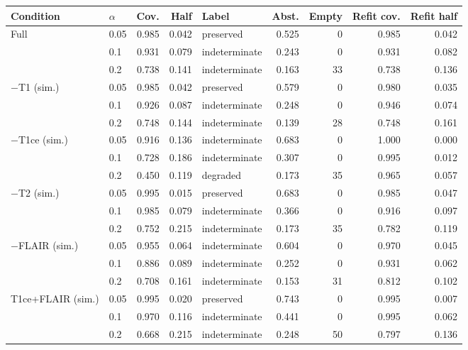 \begin{tabular}{llrrlrrrr}
\toprule
Condition & $\alpha$ & Cov. & Half & Label & Abst. & Empty & Refit cov. & Refit half \\
\midrule
Full & 0.05 & 0.985 & 0.042 & preserved & 0.525 & 0 & 0.985 & 0.042 \\
 & 0.1 & 0.931 & 0.079 & indeterminate & 0.243 & 0 & 0.931 & 0.082 \\
 & 0.2 & 0.738 & 0.141 & indeterminate & 0.163 & 33 & 0.738 & 0.136 \\
$-$T1 (sim.) & 0.05 & 0.985 & 0.042 & preserved & 0.579 & 0 & 0.980 & 0.035 \\
 & 0.1 & 0.926 & 0.087 & indeterminate & 0.248 & 0 & 0.946 & 0.074 \\
 & 0.2 & 0.748 & 0.144 & indeterminate & 0.139 & 28 & 0.748 & 0.161 \\
$-$T1ce (sim.) & 0.05 & 0.916 & 0.136 & indeterminate & 0.683 & 0 & 1.000 & 0.000 \\
 & 0.1 & 0.728 & 0.186 & indeterminate & 0.307 & 0 & 0.995 & 0.012 \\
 & 0.2 & 0.450 & 0.119 & degraded & 0.173 & 35 & 0.965 & 0.057 \\
$-$T2 (sim.) & 0.05 & 0.995 & 0.015 & preserved & 0.683 & 0 & 0.985 & 0.047 \\
 & 0.1 & 0.985 & 0.079 & indeterminate & 0.366 & 0 & 0.916 & 0.097 \\
 & 0.2 & 0.752 & 0.215 & indeterminate & 0.173 & 35 & 0.782 & 0.119 \\
$-$FLAIR (sim.) & 0.05 & 0.955 & 0.064 & indeterminate & 0.604 & 0 & 0.970 & 0.045 \\
 & 0.1 & 0.886 & 0.089 & indeterminate & 0.252 & 0 & 0.931 & 0.062 \\
 & 0.2 & 0.708 & 0.161 & indeterminate & 0.153 & 31 & 0.812 & 0.102 \\
T1ce+FLAIR (sim.) & 0.05 & 0.995 & 0.020 & preserved & 0.743 & 0 & 0.995 & 0.007 \\
 & 0.1 & 0.970 & 0.116 & indeterminate & 0.441 & 0 & 0.995 & 0.062 \\
 & 0.2 & 0.668 & 0.215 & indeterminate & 0.248 & 50 & 0.797 & 0.136 \\
\bottomrule
\end{tabular}
